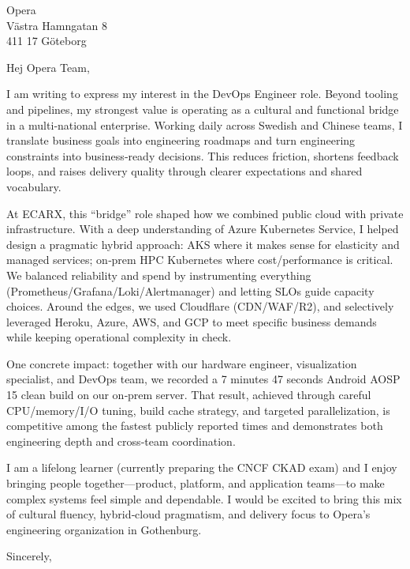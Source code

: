 \documentclass[a4paper,10pt]{letter}
\begin{document}
\pagestyle{empty} %

\begin{letter}{Opera\\V\"{a}stra Hamngatan 8\\411 17 G\"{o}teborg}

\opening{Hej Opera Team,}

\vspace{10pt}

I am writing to express my interest in the DevOps Engineer role. Beyond tooling and pipelines, my strongest value is operating as a cultural and functional bridge in a multi‑national enterprise. Working daily across Swedish and Chinese teams, I translate business goals into engineering roadmaps and turn engineering constraints into business‑ready decisions. This reduces friction, shortens feedback loops, and raises delivery quality through clearer expectations and shared vocabulary.

At ECARX, this “bridge” role shaped how we combined public cloud with private infrastructure. With a deep understanding of Azure Kubernetes Service, I helped design a pragmatic hybrid approach: AKS where it makes sense for elasticity and managed services; on‑prem HPC Kubernetes where cost/performance is critical. We balanced reliability and spend by instrumenting everything (Prometheus/Grafana/Loki/Alertmanager) and letting SLOs guide capacity choices. Around the edges, we used Cloudflare (CDN/WAF/R2), and selectively leveraged Heroku, Azure, AWS, and GCP to meet specific business demands while keeping operational complexity in check.

One concrete impact: together with our hardware engineer, visualization specialist, and DevOps team, we recorded a 7 minutes 47 seconds Android AOSP 15 clean build on our on‑prem server. That result, achieved through careful CPU/memory/I/O tuning, build cache strategy, and targeted parallelization, is competitive among the fastest publicly reported times and demonstrates both engineering depth and cross‑team coordination.

I am a lifelong learner (currently preparing the CNCF CKAD exam) and I enjoy bringing people together—product, platform, and application teams—to make complex systems feel simple and dependable. I would be excited to bring this mix of cultural fluency, hybrid‑cloud pragmatism, and delivery focus to Opera’s engineering organization in Gothenburg.

\vspace{12pt}

\closing{Sincerely,}

\signature{Hongzhi Li\\Ebbe Lieberathsgatan 27\\412 65 Göteborg\\hongzhili01@gmail.com\\0728384299\\2025.09.11}

\end{letter}
\end{document}
